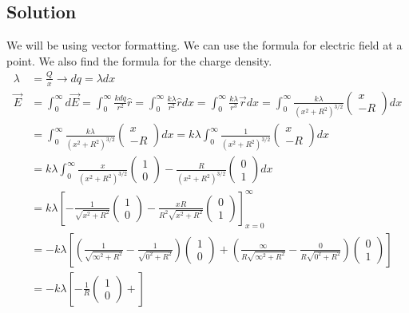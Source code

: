 \documentclass[12pt]{article}
\begin{document}
\subsection*{Solution}
We will be using vector formatting. We can use the formula for electric field at a point. We also find the formula for the charge density.
\begin{align*}
    \lambda &=  \frac{Q}{x} \rightarrow
    dq  =   \lambda dx\\
    \vec{E} &=  \int_{0}^{\infty} d\vec{E}
        =   \int_{0}^{\infty} \frac{k dq}{r^2} \hat{r}
        =   \int_{0}^{\infty} \frac{k \lambda}{r^2} \hat{r} dx
        =   \int_{0}^{\infty} \frac{k \lambda}{r^3} \vec{r} dx
        =   \int_{0}^{\infty} \frac{k \lambda}{(x^2 + R^2)^{3/2}} \begin{pmatrix}x\\-R\end{pmatrix} dx\\
        &=  \int_{0}^{\infty} \frac{k \lambda}{(x^2 + R^2)^{3/2}} \begin{pmatrix}x\\-R\end{pmatrix} dx
        =   k \lambda \int_{0}^{\infty} \frac{1}{(x^2 + R^2)^{3/2}} \begin{pmatrix}x\\-R\end{pmatrix} dx\\
        &=  k \lambda \int_{0}^{\infty} \frac{x}{(x^2 + R^2)^{3/2}} \begin{pmatrix}1\\0\end{pmatrix} - \frac{R}{(x^2 + R^2)^{3/2}} \begin{pmatrix}0\\1\end{pmatrix} dx\\
        &=  k \lambda \left[-\frac{1}{\sqrt{x^2 + R^2}} \begin{pmatrix}1\\0\end{pmatrix} - \frac{xR}{R^2\sqrt{x^2 + R^2}} \begin{pmatrix}0\\1\end{pmatrix}\right]_{x=0}^{\infty}\\
        &=  -k\lambda \left[\left(\frac{1}{\sqrt{\infty^2 + R^2}} - \frac{1}{\sqrt{0^2 + R^2}}\right) \begin{pmatrix}1\\0\end{pmatrix} + \left(\frac{\infty}{R\sqrt{\infty^2 + R^2}} - \frac{0}{R\sqrt{0^2 + R^2}}\right) \begin{pmatrix}0\\1\end{pmatrix}\right]\\
        &=  -k\lambda \left[-\frac{1}{R} \begin{pmatrix}1\\0\end{pmatrix} + \right]
\end{align*}
\end{document}

